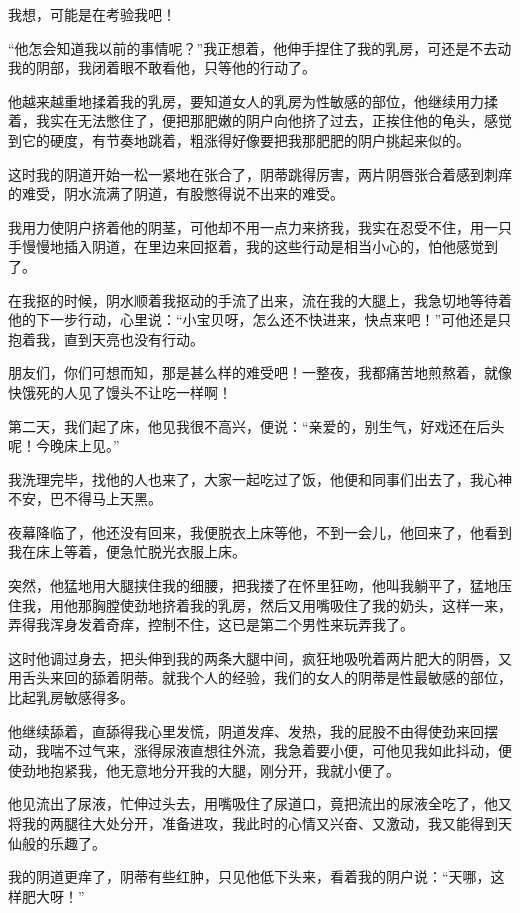 \documentclass[12pt,UTF8]{ctexbook}
\begin{document}
我想，可能是在考验我吧！

“他怎会知道我以前的事情呢？”我正想着，他伸手捏住了我的乳房，可还是不去动我的阴部，我闭着眼不敢看他，只等他的行动了。

他越来越重地揉着我的乳房，要知道女人的乳房为性敏感的部位，他继续用力揉着，我实在无法憋住了，便把那肥嫩的阴户向他挤了过去，正挨住他的龟头，感觉到它的硬度，有节奏地跳着，粗涨得好像要把我那肥肥的阴户挑起来似的。

这时我的阴道开始一松一紧地在张合了，阴蒂跳得厉害，两片阴唇张合着感到刺痒的难受，阴水流满了阴道，有股憋得说不出来的难受。

我用力使阴户挤着他的阴茎，可他却不用一点力来挤我，我实在忍受不住，用一只手慢慢地插入阴道，在里边来回抠着，我的这些行动是相当小心的，怕他感觉到了。

在我抠的时候，阴水顺着我抠动的手流了出来，流在我的大腿上，我急切地等待着他的下一步行动，心里说：“小宝贝呀，怎么还不快进来，快点来吧！”可他还是只抱着我，直到天亮也没有行动。

朋友们，你们可想而知，那是甚么样的难受吧！一整夜，我都痛苦地煎熬着，就像快饿死的人见了馒头不让吃一样啊！

第二天，我们起了床，他见我很不高兴，便说：“亲爱的，别生气，好戏还在后头呢！今晚床上见。”

我洗理完毕，找他的人也来了，大家一起吃过了饭，他便和同事们出去了，我心神不安，巴不得马上天黑。

夜幕降临了，他还没有回来，我便脱衣上床等他，不到一会儿，他回来了，他看到我在床上等着，便急忙脱光衣服上床。

突然，他猛地用大腿挟住我的细腰，把我搂了在怀里狂吻，他叫我躺平了，猛地压住我，用他那胸膛使劲地挤着我的乳房，然后又用嘴吸住了我的奶头，这样一来，弄得我浑身发着奇痒，控制不住，这已是第二个男性来玩弄我了。

这时他调过身去，把头伸到我的两条大腿中间，疯狂地吸吮着两片肥大的阴唇，又用舌头来回的舔着阴蒂。就我个人的经验，我们的女人的阴蒂是性最敏感的部位，比起乳房敏感得多。

他继续舔着，直舔得我心里发慌，阴道发痒、发热，我的屁股不由得使劲来回摆动，我喘不过气来，涨得尿液直想往外流，我急着要小便，可他见我如此抖动，便使劲地抱紧我，他无意地分开我的大腿，刚分开，我就小便了。

他见流出了尿液，忙伸过头去，用嘴吸住了尿道口，竟把流出的尿液全吃了，他又将我的两腿往大处分开，准备进攻，我此时的心情又兴奋、又激动，我又能得到天仙般的乐趣了。

我的阴道更痒了，阴蒂有些红肿，只见他低下头来，看着我的阴户说：“天哪，这样肥大呀！”
\end{document}
